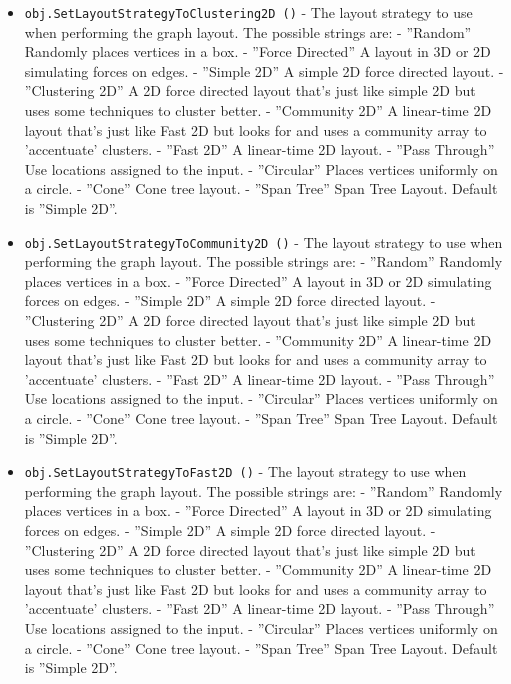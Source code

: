 \begin{itemize}
\item  \verb|obj.SetLayoutStrategyToClustering2D ()| -  The layout strategy to use when performing the graph layout.
 The possible strings are:
  - ''Random''         Randomly places vertices in a box.
  - ''Force Directed'' A layout in 3D or 2D simulating forces on edges.
  - ''Simple 2D''      A simple 2D force directed layout.
  - ''Clustering 2D''  A 2D force directed layout that's just like
                     simple 2D but uses some techniques to cluster better.
  - ''Community 2D''   A linear-time 2D layout that's just like
                    Fast 2D but looks for and uses a community 
                    array to 'accentuate' clusters.
  - ''Fast 2D''       A linear-time 2D layout.
  - ''Pass Through''  Use locations assigned to the input.
  - ''Circular''      Places vertices uniformly on a circle.
  - ''Cone''          Cone tree layout.
  - ''Span Tree''     Span Tree Layout.
 Default is ''Simple 2D''.

\item  \verb|obj.SetLayoutStrategyToCommunity2D ()| -  The layout strategy to use when performing the graph layout.
 The possible strings are:
  - ''Random''         Randomly places vertices in a box.
  - ''Force Directed'' A layout in 3D or 2D simulating forces on edges.
  - ''Simple 2D''      A simple 2D force directed layout.
  - ''Clustering 2D''  A 2D force directed layout that's just like
                     simple 2D but uses some techniques to cluster better.
  - ''Community 2D''   A linear-time 2D layout that's just like
                    Fast 2D but looks for and uses a community 
                    array to 'accentuate' clusters.
  - ''Fast 2D''       A linear-time 2D layout.
  - ''Pass Through''  Use locations assigned to the input.
  - ''Circular''      Places vertices uniformly on a circle.
  - ''Cone''          Cone tree layout.
  - ''Span Tree''     Span Tree Layout.
 Default is ''Simple 2D''.

\item  \verb|obj.SetLayoutStrategyToFast2D ()| -  The layout strategy to use when performing the graph layout.
 The possible strings are:
  - ''Random''         Randomly places vertices in a box.
  - ''Force Directed'' A layout in 3D or 2D simulating forces on edges.
  - ''Simple 2D''      A simple 2D force directed layout.
  - ''Clustering 2D''  A 2D force directed layout that's just like
                     simple 2D but uses some techniques to cluster better.
  - ''Community 2D''   A linear-time 2D layout that's just like
                    Fast 2D but looks for and uses a community 
                    array to 'accentuate' clusters.
  - ''Fast 2D''       A linear-time 2D layout.
  - ''Pass Through''  Use locations assigned to the input.
  - ''Circular''      Places vertices uniformly on a circle.
  - ''Cone''          Cone tree layout.
  - ''Span Tree''     Span Tree Layout.
 Default is ''Simple 2D''.


\end{itemize}
